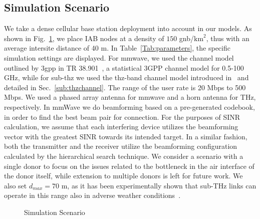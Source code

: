 \subsection{Simulation Scenario}
\label{sub:SimScenario}
We take a dense cellular base station deployment into account in our models. As shown in Fig.~\ref{fig:SimulationScenario}, we place IAB nodes at a density of $150$ \gls{gnb}/$\mathrm{km}^2$, thus with an average intersite distance of 40 m. 
In Table~\ref{Tab:parameters}, the specific simulation settings are displayed. For \gls{mmwave}, we used the channel model outlined by \gls{3gpp} in TR 38.901~\cite{3gpp.38.901}, a statistical 3GPP channel model for 0.5-100 GHz, while for sub-\gls{thz} we used the \gls{thz}-band channel model introduced in~\cite{5995306} and detailed in Sec.~\ref{sub:thzchannel}. The range of the user rate is 20 Mbps to 500 Mbps. 
We used a phased array antenna for \gls{mmwave} and a horn antenna for THz, respectively. In mmWave we do beamforming based on a pre-generated codebook, in order to find the best beam pair for connection. For the purposes of SINR calculation, we assume that each interfering device utilizes the beamforming vector with the greatest SINR towards its intended target. In a similar fashion, both the transmitter and the receiver utilize the beamforming configuration calculated by the hierarchical search technique.
We consider a scenario with a single donor to focus on the issues related to the bottleneck in the air interface of the donor itself, while extension to multiple donors is left for future work. We also set $d_{max} = 70$ m, as it has been experimentally shown that sub-THz links can operate in this range also in adverse weather conditions~\cite{sen2022terahertz}. 



\begin{figure}
    \centering
    \setlength{}
    \setlength{}
    
    \caption{Simulation Scenario}
    \label{fig:SimulationScenario}
\end{figure}

